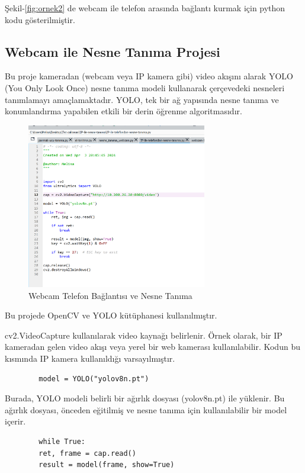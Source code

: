 \documentclass[11pt,a4paper]{report}
\begin{document}
	Şekil-\ref{fig:ornek2} de webcam ile telefon arasında bağlantı kurmak için python kodu gösterilmiştir.
	
	\subsection{Webcam ile Nesne Tanıma Projesi}
	Bu proje kameradan (webcam veya IP kamera gibi) video akışını alarak YOLO (You Only Look Once) nesne tanıma modeli kullanarak çerçevedeki nesneleri tanımlamayı amaçlamaktadır. YOLO, tek bir ağ yapısında nesne tanıma ve konumlandırma yapabilen etkili bir derin öğrenme algoritmasıdır.
	\newpage
	\begin{figure}[!ht]
		\centering
		\includegraphics[width=0.7\textwidth]{webcam-telefon-tanima}
		\caption{Webcam Telefon Bağlantısı ve Nesne Tanıma}
		\label{fig:ornek3}
	\end{figure}
	
	Bu projede OpenCV ve YOLO kütüphanesi kullanılmıştır.\newline
	
	cv2.VideoCapture kullanılarak video kaynağı belirlenir. Örnek olarak, bir IP kameradan gelen video akışı veya yerel bir web kamerası kullanılabilir. Kodun bu kısmında IP kamera kullanıldığı varsayılmıştır.
	
	\begin{verbatim}
		model = YOLO("yolov8n.pt")
	\end{verbatim}
	
	Burada, YOLO modeli belirli bir ağırlık dosyası (yolov8n.pt) ile yüklenir. Bu ağırlık dosyası, önceden eğitilmiş ve nesne tanıma için kullanılabilir bir model içerir.
	
	\begin{verbatim}
		while True:
		ret, frame = cap.read()
		result = model(frame, show=True)
	\end{verbatim}
	
\end{document}
